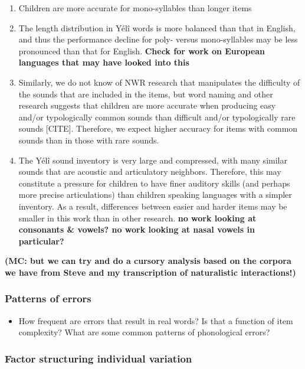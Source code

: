 \documentclass[english,,man,floatsintext]{apa6}
\providecommand{\tightlist}{%
  \setlength{\itemsep}{0pt}\setlength{\parskip}{0pt}}
\begin{document}
\begin{enumerate}
\def\labelenumi{\arabic{enumi}.}
\item
  Children are more accurate for mono-syllables than longer items
\item
  The length distribution in Yélî words is more balanced than that in English, and thus the performance decline for poly- versus mono-syllables may be less pronounced than that for English. \textbf{Check for work on European languages that may have looked into this}
\item
  Similarly, we do not know of NWR research that manipulates the difficulty of the sounds that are included in the items, but word naming and other research suggests that children are more accurate when producing easy and/or typologically common sounds than difficult and/or typologically rare sounds {[}CITE{]}. Therefore, we expect higher accuracy for items with common sounds than in those with rare sounds.
\item
  The Yélî sound inventory is very large and compressed, with many similar sounds that are acoustic and articulatory neighbors. Therefore, this may constitute a pressure for children to have finer auditory skills (and perhaps more precise articulations) than children speaking languages with a simpler inventory. As a result, differences between easier and harder items may be smaller in this work than in other research. \textbf{no work looking at consonants \& vowels? no work looking at nasal vowels in particular?}
\end{enumerate}

\textbf{(MC: but we can try and do a cursory analysis based on the corpora we have from Steve and my transcription of naturalistic interactions!)}

\hypertarget{patterns-of-errors}{%
\subsubsection{Patterns of errors}\label{patterns-of-errors}}

\begin{itemize}
\tightlist
\item
  How frequent are errors that result in real words? Is that a function of item complexity? What are some common patterns of phonological errors?
\end{itemize}

\hypertarget{factor-structuring-individual-variation}{%
\subsubsection{Factor structuring individual variation}\label{factor-structuring-individual-variation}}
\end{document}
